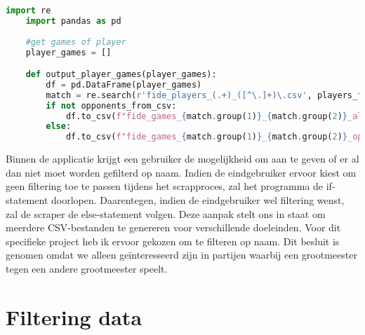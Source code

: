 \begin{lstlisting}[language=Python]
    import re
    import pandas as pd
    
    #get games of player
    player_games = []

    def output_player_games(player_games):
        df = pd.DataFrame(player_games)
        match = re.search(r'fide_players_(.+)_([^\.]+)\.csv', players_file_name)
        if not opponents_from_csv:
            df.to_csv(f"fide_games_{match.group(1)}_{match.group(2)}_all.csv", index=False)
        else:
            df.to_csv(f"fide_games_{match.group(1)}_{match.group(2)}_oppfromcsv.csv", index=False)
\end{lstlisting}

Binnen de applicatie krijgt een gebruiker de mogelijkheid om aan te geven of er al dan niet moet worden gefilterd op naam. Indien de eindgebruiker ervoor kiest om geen filtering toe te passen tijdens het scrapproces, zal het programma de if-statement doorlopen. Daarentegen, indien de eindgebruiker wel filtering wenst, zal de scraper de else-statement volgen. Deze aanpak stelt ons in staat om meerdere CSV-bestanden te genereren voor verschillende doeleinden. Voor dit specifieke project heb ik ervoor gekozen om te filteren op naam. Dit besluit is genomen omdat we alleen geïnteresseerd zijn in partijen waarbij een grootmeester tegen een andere grootmeester speelt.

\section{Filtering data}



